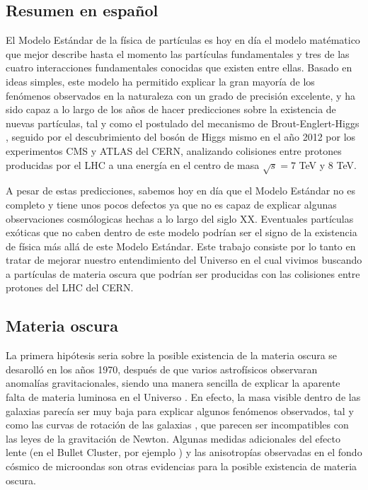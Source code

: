 \documentclass[a4paper, 10pt, openright]{report}
\begin{document}
\begin{appendices}

\chapter{Resumen en espa\~{n}ol} \label{appendix:Resumen}

El Modelo Est\'{a}ndar de la f\'{i}sica de part\'{i}culas \cite{SM} es hoy en d\'{i}a el modelo mat\'{e}matico que mejor describe hasta el momento las part\'{i}culas fundamentales y tres de las cuatro interacciones fundamentales conocidas que existen entre ellas. Basado en ideas simples, este modelo ha permitido explicar la gran mayor\'{i}a de los fen\'{o}menos observados en la naturaleza con un grado de precisi\'{o}n excelente, y ha sido capaz a lo largo de los a\~{n}os de hacer predicciones sobre la existencia de nuevas part\'{i}culas, tal y como el postulado del mecanismo de Brout-Englert-Higgs \cite{HiggsPostulate1, HiggsPostulate2}, seguido por el descubrimiento del bos\'{o}n de Higgs mismo en el a\~{n}o 2012 \cite{HiggsDiscovery1, HiggsDiscovery2} por los experimentos \ac{CMS} \cite{CMS} y \ac{ATLAS} \cite{ATLAS} del \ac{CERN}, analizando colisiones entre protones producidas por el \ac{LHC} a una energ\'{i}a en el centro de masa $\sqrt{s} = 7$ TeV y $8$ TeV.

A pesar de estas predicciones, sabemos hoy en d\'{i}a que el Modelo Est\'{a}ndar no es completo y tiene unos pocos defectos ya que no es capaz de explicar algunas observaciones cosm\'{o}logicas hechas a lo largo del siglo XX. Eventuales part\'{i}culas ex\'{o}ticas que no caben dentro de este modelo podr\'{i}an ser el signo de la existencia de f\'{i}sica m\'{a}s all\'{a} de este Modelo Est\'{a}ndar. Este trabajo consiste por lo tanto en tratar de mejorar nuestro entendimiento del Universo en el cual vivimos buscando a part\'{i}culas de materia oscura que podr\'{i}an ser producidas con las colisiones entre protones del \acf{LHC} del \ac{CERN}.

\section{Materia oscura}

La primera hip\'{o}tesis seria sobre la posible existencia de la materia oscura se desaroll\'{o} en los a\~{n}os 1970, despu\'{e}s de que varios astrof\'{i}sicos observaran anomal\'{i}as gravitacionales, siendo una manera sencilla de explicar la aparente falta de materia luminosa en el Universo \cite{FirstEvidence}. En efecto, la masa visible dentro de las galaxias parec\'{i}a ser muy baja para explicar algunos fen\'{o}menos observados, tal y como las curvas de rotaci\'{o}n de las galaxias \cite{RotationCurves}, que parecen ser incompatibles con las leyes de la gravitaci\'{o}n de Newton. Algunas medidas adicionales del efecto lente (en el Bullet Cluster, por ejemplo \cite{BulletCluster}) y las anisotrop\'{i}as observadas en el fondo c\'{o}smico de microondas \cite{CMBAnisotropies} son otras evidencias para la posible existencia de materia oscura.


\end{appendices}
\end{document}
